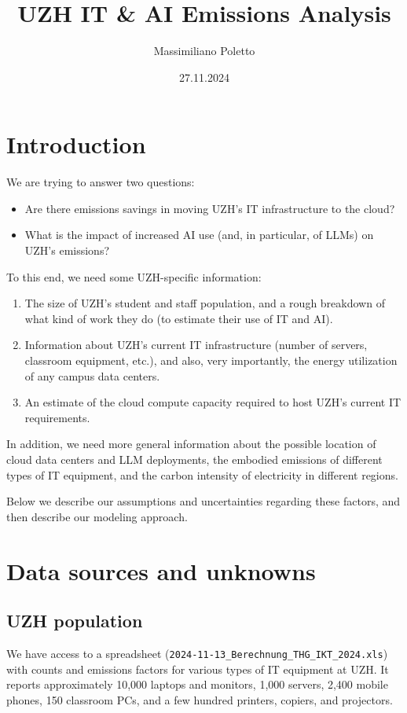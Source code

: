 \documentclass[11pt]{article}
\title{UZH IT \& AI Emissions Analysis\vspace{-1em}}
\author{Massimiliano Poletto}
\date{\vspace{-1em}27.11.2024}
\begin{document}
\maketitle
\section{Introduction}

We are trying to answer two questions:
\begin{itemize}
    \item Are there emissions savings in moving UZH's IT infrastructure to the cloud?
    \item What is the impact of increased AI use (and, in particular, of LLMs) on UZH's emissions?
\end{itemize}

To this end, we need some UZH-specific information:
\begin{enumerate}
    \item The size of UZH's student and staff population, and a rough breakdown of
        what kind of work they do (to estimate their use of IT and AI).
    \item Information about UZH's current IT infrastructure (number of servers,
        classroom equipment, etc.), and also, very importantly, the energy utilization of any
        campus data centers.
    \item An estimate of the cloud compute capacity required to host UZH's current IT requirements.
\end{enumerate}

In addition, we need more general information about the possible location of cloud data centers and
LLM deployments, the embodied emissions of different types of IT equipment, and the carbon intensity
of electricity in different regions.

Below we describe our assumptions and uncertainties regarding these factors, and then describe
our modeling approach.

\section{Data sources and unknowns}

\subsection{UZH population}

We have access to a spreadsheet (\texttt{2024-11-13\_Berechnung\_THG\_IKT\_2024.xls}) with
counts and emissions factors for various types of IT equipment at UZH. It reports approximately
10,000 laptops and monitors, 1,000 servers, 2,400 mobile phones,  150 classroom PCs, and a few
hundred printers, copiers, and projectors.
\end{document}

